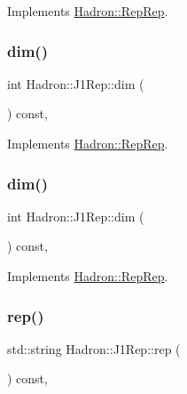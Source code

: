 Implements \mbox{\hyperlink{structHadron_1_1RepRep_a92c8802e5ed7afd7da43ccfd5b7cd92b}{Hadron\+::\+Rep\+Rep}}.

\mbox{\label{structHadron_1_1J1Rep_a59c9039238a259026aa68b2c30b3822a}} 
\subsubsection{\texorpdfstring{dim()}{dim()}\hspace{0.1cm}{\footnotesize\ttfamily [4/5]}}
{\footnotesize\ttfamily int Hadron\+::\+J1\+Rep\+::dim (\begin{DoxyParamCaption}{ }\end{DoxyParamCaption}) const\hspace{0.3cm}{\ttfamily [inline]}, {\ttfamily [virtual]}}



Implements \mbox{\hyperlink{structHadron_1_1RepRep_a92c8802e5ed7afd7da43ccfd5b7cd92b}{Hadron\+::\+Rep\+Rep}}.

\mbox{\label{structHadron_1_1J1Rep_a59c9039238a259026aa68b2c30b3822a}} 
\subsubsection{\texorpdfstring{dim()}{dim()}\hspace{0.1cm}{\footnotesize\ttfamily [5/5]}}
{\footnotesize\ttfamily int Hadron\+::\+J1\+Rep\+::dim (\begin{DoxyParamCaption}{ }\end{DoxyParamCaption}) const\hspace{0.3cm}{\ttfamily [inline]}, {\ttfamily [virtual]}}



Implements \mbox{\hyperlink{structHadron_1_1RepRep_a92c8802e5ed7afd7da43ccfd5b7cd92b}{Hadron\+::\+Rep\+Rep}}.

\mbox{\label{structHadron_1_1J1Rep_af725f8ff10c84cda5410728ce30697da}} 
\subsubsection{\texorpdfstring{rep()}{rep()}\hspace{0.1cm}{\footnotesize\ttfamily [1/5]}}
{\footnotesize\ttfamily std\+::string Hadron\+::\+J1\+Rep\+::rep (\begin{DoxyParamCaption}{ }\end{DoxyParamCaption}) const\hspace{0.3cm}{\ttfamily [inline]}, {\ttfamily [virtual]}}



